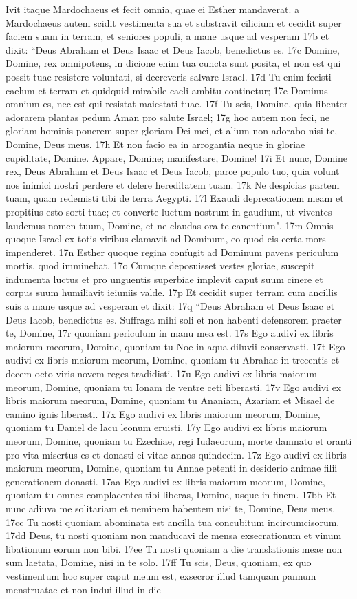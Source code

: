 \begin{biblechapter}
\verse Ivit itaque Mardochaeus et fecit omnia, quae ei Esther mandaverat. 
\verse a Mardochaeus autem scidit vestimenta sua et substravit cilicium et cecidit super faciem suam in terram, et seniores populi, a mane usque ad vesperam  17b et dixit: “Deus Abraham et Deus Isaac et Deus Iacob, benedictus es. 17c Domine, Domine, rex omnipotens, in dicione enim tua cuncta sunt posita, et non est qui possit tuae resistere voluntati, si decreveris salvare Israel. 17d Tu enim fecisti caelum et terram et quidquid mirabile caeli ambitu continetur; 17e Dominus omnium es, nec est qui resistat maiestati tuae. 17f Tu scis, Domine, quia libenter adorarem plantas pedum Aman pro salute Israel; 17g hoc autem non feci, ne gloriam hominis ponerem super gloriam Dei mei, et alium non adorabo nisi te, Domine, Deus meus. 17h Et non facio ea in arrogantia neque in gloriae cupiditate, Domine. Appare, Domine; manifestare, Domine! 17i Et nunc, Domine rex, Deus Abraham et Deus Isaac et Deus Iacob, parce populo tuo, quia volunt nos inimici nostri perdere et delere hereditatem tuam. 17k Ne despicias partem tuam, quam redemisti tibi de terra Aegypti. 17l Exaudi deprecationem meam et propitius esto sorti tuae; et converte luctum nostrum in gaudium, ut viventes laudemus nomen tuum, Domine, et ne claudas ora te canentium". 17m Omnis quoque Israel ex totis viribus clamavit ad Dominum, eo quod eis certa mors impenderet. 17n Esther quoque regina confugit ad Dominum pavens periculum mortis, quod imminebat. 17o Cumque deposuisset vestes gloriae, suscepit indumenta luctus et pro unguentis superbiae implevit caput suum cinere et corpus suum humiliavit ieiuniis valde. 17p Et cecidit super terram cum ancillis suis a mane usque ad vesperam et dixit: 17q “Deus Abraham et Deus Isaac et Deus Iacob, benedictus es. Suffraga mihi soli et non habenti defensorem praeter te, Domine, 17r quoniam periculum in manu mea est. 17s Ego audivi ex libris maiorum meorum, Domine, quoniam tu Noe in aqua diluvii conservasti. 17t Ego audivi ex libris maiorum meorum, Domine, quoniam tu Abrahae in trecentis et decem octo viris novem reges tradidisti. 17u Ego audivi ex libris maiorum meorum, Domine, quoniam tu Ionam de ventre ceti liberasti. 17v Ego audivi ex libris maiorum meorum, Domine, quoniam tu Ananiam, Azariam et Misael de camino ignis liberasti. 17x Ego audivi ex libris maiorum meorum, Domine, quoniam tu Daniel de lacu leonum eruisti. 17y Ego audivi ex libris maiorum meorum, Domine, quoniam tu Ezechiae, regi Iudaeorum, morte damnato et oranti pro vita misertus es et donasti ei vitae annos quindecim. 17z Ego audivi ex libris maiorum meorum, Domine, quoniam tu Annae petenti in desiderio animae filii generationem donasti. 17aa Ego audivi ex libris maiorum meorum, Domine, quoniam tu omnes complacentes tibi liberas, Domine, usque in finem. 17bb Et nunc adiuva me solitariam et neminem habentem nisi te, Domine, Deus meus. 17cc Tu nosti quoniam abominata est ancilla tua concubitum incircumcisorum. 17dd Deus, tu nosti quoniam non manducavi de mensa exsecrationum et vinum libationum eorum non bibi. 17ee Tu nosti quoniam a die translationis meae non sum laetata, Domine, nisi in te solo. 17ff Tu scis, Deus, quoniam, ex quo vestimentum hoc super caput meum est, exsecror illud tamquam pannum menstruatae et non indui illud in die 
\end{biblechapter}
